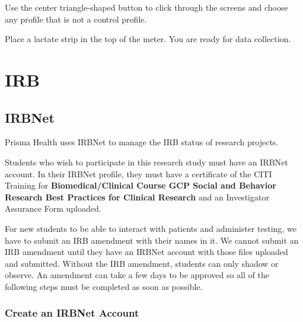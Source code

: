 \documentclass[
]{book}
\begin{document}
Use the center triangle-shaped button to click through the screens and choose any profile that is not a control profile.

Place a lactate strip in the top of the meter. You are ready for data collection.

\hypertarget{IRB}{%
\chapter{IRB}\label{IRB}}

\hypertarget{IRBNet}{%
\section{IRBNet}\label{IRBNet}}

Prisma Health uses IRBNet to manage the IRB status of research projects.

Students who wish to participate in this research study must have an IRBNet account. In their IRBNet profile, they must have a certificate of the CITI Training for \textbf{Biomedical/Clinical Course GCP Social and Behavior Research Best Practices for Clinical Research} and an Investigator Assurance Form uploaded.

For new students to be able to interact with patients and administer testing, we have to submit an IRB amendment with their names in it. We cannot submit an IRB amendment until they have an IRBNet account with those files uploaded and submitted. Without the IRB amendment, students can only shadow or observe. An amendment can take a few days to be approved so all of the following steps must be completed as soon as possible.

\hypertarget{CreateIRBNetAccount}{%
\subsection{Create an IRBNet Account}\label{CreateIRBNetAccount}}
\end{document}
